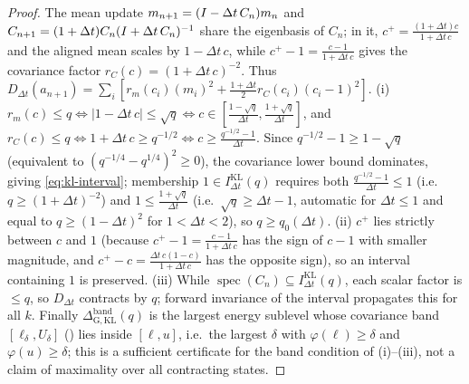 \begin{proof}
The mean update $m_{n+1}=(I-\Delta t\,C_n)m_n$ and $C_{n+1}=(1+\Delta t)C_n(I+\Delta t\,C_n)^{-1}$
share the eigenbasis of $C_n$; in it, $c^+=\frac{(1+\Delta t)c}{1+\Delta t\,c}$ and the
aligned mean scales by $1-\Delta t\,c$, while $c^+-1=\frac{c-1}{1+\Delta t\,c}$ gives the
covariance factor $r_C(c)=(1+\Delta t\,c)^{-2}$. Thus
$D_{\Delta t}(a_{n+1})=\sum_i[r_m(c_i)(m_i)^2+\tfrac{1+\Delta t}2r_C(c_i)(c_i-1)^2]$.
(i) $r_m(c)\leq q\Leftrightarrow|1-\Delta t\,c|\leq\sqrt q\Leftrightarrow c\in[\tfrac{1-\sqrt q}{\Delta t},\tfrac{1+\sqrt q}{\Delta t}]$,
and $r_C(c)\leq q\Leftrightarrow1+\Delta t\,c\geq q^{-1/2}\Leftrightarrow c\geq\tfrac{q^{-1/2}-1}{\Delta t}$.
Since $q^{-1/2}-1\geq1-\sqrt q$ (equivalent to $(q^{-1/4}-q^{1/4})^2\geq0$), the covariance
lower bound dominates, giving \eqref{eq:kl-interval}; membership $1\in I_{\Delta t}^{\mathrm{KL}}(q)$
requires both $\tfrac{q^{-1/2}-1}{\Delta t}\leq1$ (i.e.\ $q\geq(1+\Delta t)^{-2}$) and
$1\leq\tfrac{1+\sqrt q}{\Delta t}$ (i.e.\ $\sqrt q\geq\Delta t-1$, automatic for
$\Delta t\leq1$ and equal to $q\geq(1-\Delta t)^2$ for $1<\Delta t<2$), so
$q\geq q_0(\Delta t)$. (ii) $c^+$ lies strictly between $c$ and $1$ (because
$c^+-1=\frac{c-1}{1+\Delta t\,c}$ has the sign of $c-1$ with smaller magnitude, and
$c^+-c=\frac{\Delta t\,c(1-c)}{1+\Delta t\,c}$ has the opposite sign), so an interval
containing $1$ is preserved. (iii) While $\operatorname{spec}(C_n)\subseteq I_{\Delta t}^{\mathrm{KL}}(q)$,
each scalar factor is $\leq q$, so $D_{\Delta t}$ contracts by $q$; forward invariance of the
interval propagates this for all $k$. Finally $\Delta_{\mathrm{G,KL}}^{\mathrm{band}}(q)$ is
the largest energy sublevel whose covariance band $[\ell_\delta,U_\delta]$ ()
lies inside $[\ell,u]$, i.e.\ the largest $\delta$ with $\varphi(\ell)\geq\delta$ and
$\varphi(u)\geq\delta$; this is a sufficient certificate for the band condition of (i)--(iii),
not a claim of maximality over all contracting states.
\end{proof}

